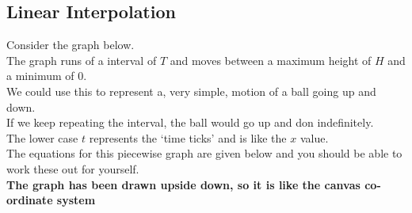 \documentclass[a4paper,12pt]{article}
\begin{document}
\subsection{Linear Interpolation}
Consider the graph below.\\
The graph runs of a interval of $T$ and moves between a maximum height of $H$ and a minimum of $0$.\\
We could use this to represent a, very simple, motion of a ball going up and down.\\
If we keep repeating the interval, the ball would go up and don indefinitely.\\
The lower case $t$ represents the `time ticks' and is like the $x$ value.\\
The equations for this piecewise graph are given below and you should be able to work these out for yourself.\\

\textbf{The graph has been drawn upside down, so it is like the canvas co-ordinate system}
\end{document}

